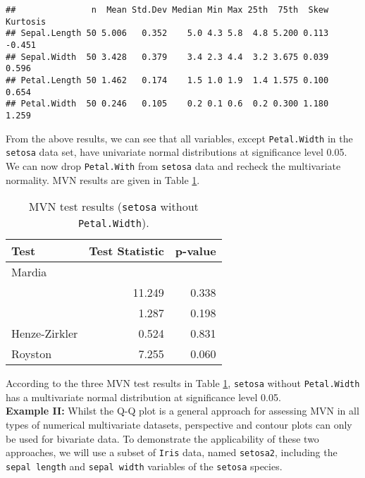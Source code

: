 \documentclass[11pt]{article}\usepackage[]{graphicx}\usepackage[]{color}
\makeatletter
\newenvironment{kframe}{%
 \def\at@end@of@kframe{}%
 \ifinner\ifhmode%
  \def\at@end@of@kframe{\end{minipage}}%
  \begin{minipage}{\columnwidth}%
 \fi\fi%
 \def\FrameCommand##1{\hskip\@totalleftmargin \hskip-\fboxsep
 \colorbox{shadecolor}{##1}\hskip-\fboxsep
     \hskip-\linewidth \hskip-\@totalleftmargin \hskip\columnwidth}%
 \MakeFramed {\advance\hsize-\width
   \@totalleftmargin\z@ \linewidth\hsize
   \@setminipage}}%
 {\par\unskip\endMakeFramed%
 \at@end@of@kframe}
\newenvironment{knitrout}{}{} %
\makeatother
\begin{document}
\begin{knitrout}
\color{fgcolor}\begin{kframe}
\begin{verbatim}
##               n  Mean Std.Dev Median Min Max 25th  75th  Skew Kurtosis
## Sepal.Length 50 5.006   0.352    5.0 4.3 5.8  4.8 5.200 0.113   -0.451
## Sepal.Width  50 3.428   0.379    3.4 2.3 4.4  3.2 3.675 0.039    0.596
## Petal.Length 50 1.462   0.174    1.5 1.0 1.9  1.4 1.575 0.100    0.654
## Petal.Width  50 0.246   0.105    0.2 0.1 0.6  0.2 0.300 1.180    1.259
\end{verbatim}
\end{kframe}
\end{knitrout}

From the above results, we can see that all variables, except \texttt{Petal.Width} in the \texttt{setosa} data set, have univariate normal distributions at significance level 0.05. We can now drop \texttt{Petal.With} from \texttt{setosa} data and recheck the multivariate normality. MVN results are given in Table \ref{tbl:setosa}.  




\begin{table}[htb]
  \centering
    \begin{tabular}{lrr}
    \toprule
     Test & Test Statistic & p-value \\
      \midrule
      Mardia  &  &  \\
      \phantom{M}{\small{Skewness}} & 11.249 & 0.338 \\
      \phantom{M}{\small{Kurtosis}} & 1.287 & 0.198 \\
      Henze-Zirkler & 0.524 & 0.831 \\
      Royston & 7.255 & 0.060 \\
      \bottomrule
    \end{tabular}
      \caption{MVN test results (\texttt{setosa} without \texttt{Petal.Width}).} \label{tbl:setosa}
\end{table}

According to the three MVN test results in Table \ref{tbl:setosa}, \texttt{setosa} without \texttt{Petal.Width} has a multivariate normal distribution at significance level 0.05. \\
\newline
\textbf{Example II:} Whilst the Q-Q plot is a general approach for assessing MVN in all types of numerical multivariate datasets, perspective and contour plots can only be used for bivariate data. To demonstrate the applicability of these two approaches, we will use a subset of \texttt{Iris} data, named \texttt{setosa2}, including the \texttt{sepal length} and \texttt{sepal width} variables of the \texttt{setosa} species. %
\end{document}
